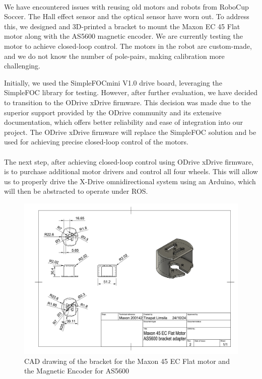 \paragraph*{}
We have encountered issues with reusing old motors and robots from RoboCup Soccer. The Hall effect sensor and the optical sensor have worn out. To address this, we designed and 3D-printed a bracket to mount the Maxon EC 45 Flat motor along with the AS5600 magnetic encoder. We are currently testing the motor to achieve closed-loop control. The motors in the robot are custom-made, and we do not know the number of pole-pairs, making calibration more challenging. 

Initially, we used the SimpleFOCmini V1.0 drive board, leveraging the SimpleFOC library for testing. However, after further evaluation, we have decided to transition to the ODrive xDrive firmware. This decision was made due to the superior support provided by the ODrive community and its extensive documentation, which offers better reliability and ease of integration into our project. The ODrive xDrive firmware will replace the SimpleFOC solution and be used for achieving precise closed-loop control of the motors.

\paragraph*{}
The next step, after achieving closed-loop control using ODrive xDrive firmware, is to purchase additional motor drivers and control all four wheels. This will allow us to properly drive the X-Drive omnidirectional system using an Arduino, which will then be abstracted to operate under ROS.
\begin{figure}
    \centering
    \includegraphics[width=1\linewidth]{assets/images/hardware/Maxon 45 EC Flat Motor AS5600 bracket adapter Drawing v1.png}
    \caption{CAD drawing of the bracket for the Maxon 45 EC Flat motor and the Magnetic Encoder for AS5600}
    \label{fig:enter-label}
\end{figure}